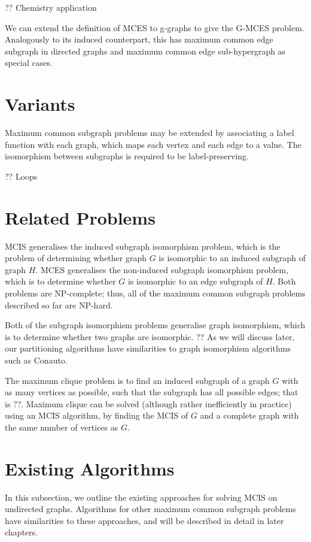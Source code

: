 ?? Chemistry application

We can extend the definition of MCES to g-graphs to give the G-MCES problem.
Analogously to its induced counterpart, this has maximum common edge subgraph
in directed graphs and maximum common edge sub-hypergraph as special cases.

\section{Variants}

Maximum common subgraph problems may be extended by associating a label
function with each graph, which maps each vertex and each edge to a value. The
isomorphism between subgraphs is required to be label-preserving.

?? Loops

\section{Related Problems}

MCIS generalises the induced subgraph isomorphism problem, which is the problem
of determining whether graph $G$ is isomorphic to an induced subgraph of graph $H$.
MCES generalises the non-induced subgraph isomorphism problem, which is to
determine whether $G$ is isomorphic to an edge subgraph of $H$. Both problems are
NP-complete; thus, all of the maximum common subgraph problems described so far
are NP-hard.

Both of the subgraph isomorphism problems generalise graph isomorphism, which
is to determine whether two graphs are isomorphic. ?? As we will discuss later,
our partitioning algorithms have similarities to graph isomorphism algorithms
such as Conauto.

The maximum clique problem is to find an induced subgraph of a graph $G$ with as
many vertices as possible, such that the subgraph has all possible edges; that
is ??. Maximum clique can be solved (although rather inefficiently in practice)
using an MCIS algorithm, by finding the MCIS of $G$ and a complete graph with the
same number of vertices as $G$.

\section{Existing Algorithms}

In this subsection, we outline the existing approaches for solving MCIS on
undirected graphs. Algorithms for other maximum common subgraph problems have
similarities to these approaches, and will be described in detail in later
chapters.


